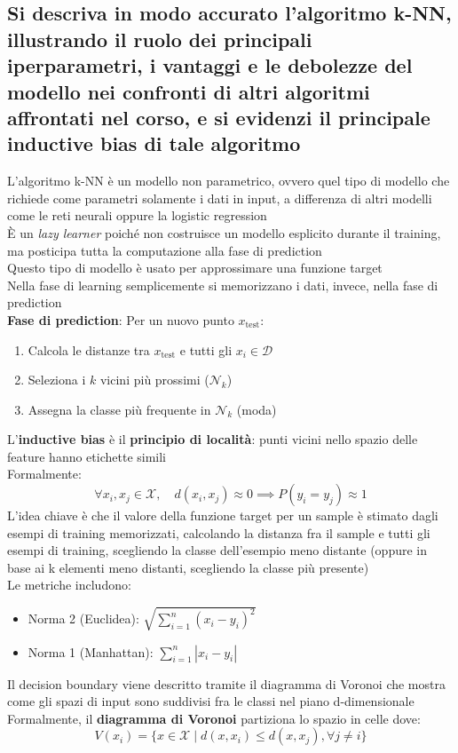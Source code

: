 \documentclass[10pt,oneside,a4paper]{article}
\begin{document}
	\subsection{Si descriva in modo accurato l’algoritmo k-NN, illustrando il ruolo dei principali iperparametri, i vantaggi e le debolezze del modello nei 
		confronti di altri algoritmi affrontati nel corso, e si evidenzi il principale inductive bias di tale algoritmo}
	L'algoritmo k-NN è un modello non parametrico, ovvero quel tipo di modello che richiede come parametri solamente i dati in input, a differenza di altri modelli come le reti neurali oppure la logistic regression\\
	È un \textit{lazy learner} poiché non costruisce un modello esplicito durante il training, ma posticipa tutta la computazione alla fase di prediction\\
	Questo tipo di modello è usato per approssimare una funzione target\\
	Nella fase di learning semplicemente si memorizzano i dati, invece, nella fase di prediction\\
	\textbf{Fase di prediction}: Per un nuovo punto $x_{\text{test}}$:
	\begin{enumerate}
		\item Calcola le distanze tra $x_{\text{test}}$ e tutti gli $x_i \in \mathcal{D}$
		\item Seleziona i $k$ vicini più prossimi ($\mathcal{N}_k$)
		\item Assegna la classe più frequente in $\mathcal{N}_k$ (moda)
	\end{enumerate}
	L'\textbf{inductive bias} è il \textbf{principio di località}: punti vicini nello spazio delle feature hanno etichette simili\\
	Formalmente:
	\[
	\forall x_i, x_j \in \mathcal{X}, \quad d(x_i,x_j) \approx 0 \implies P(y_i=y_j) \approx 1
	\]
	L'idea chiave è che il valore della funzione target per un sample è stimato dagli esempi di training memorizzati, calcolando la distanza fra il sample e tutti gli esempi di training, scegliendo la classe dell'esempio meno distante (oppure in base ai k elementi meno distanti, scegliendo la classe più presente)\\
	Le metriche includono:
	\begin{itemize}
		\item Norma 2 (Euclidea): $\sqrt{\sum_{i=1}^n (x_i-y_i)^2}$
		\item Norma 1 (Manhattan): $\sum_{i=1}^n |x_i-y_i|$
	\end{itemize}
	Il decision boundary viene descritto tramite il diagramma di Voronoi che mostra come gli spazi di input sono suddivisi fra le classi nel piano d-dimensionale\\
	Formalmente, il \textbf{diagramma di Voronoi} partiziona lo spazio in celle dove:
	\[
	V(x_i) = \{x \in \mathcal{X} \mid d(x,x_i) \leq d(x,x_j), \forall j \neq i\}
	\]
\end{document}
